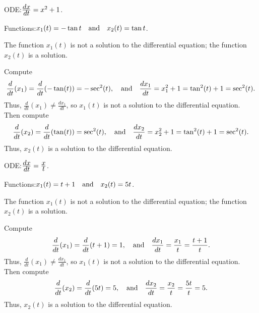 \documentclass{ximera}
\begin{document}
\begin{exercise}  \label{c3.1.bc}
ODE:\quad $\frac{\displaystyle dx}{\displaystyle dt} = x^2 + 1$.

Functions:\quad $x_1(t)=-\tan t \quad\mbox{and}\quad x_2(t)= \tan t$.

\begin{solution}

\ans The function $x_1(t)$ is not a solution to the differential equation;
the function $x_2(t)$ is a solution.

\soln Compute
\[
\frac{d}{dt}(x_1) = \frac{d}{dt}(-\tan(t)) = -\sec^2(t), \quad\mbox{and}\quad
\frac{dx_1}{dt} = x_1^2 + 1 = \tan^2(t) + 1 = \sec^2(t).
\]
Thus, $\frac{d}{dt}(x_1) \neq \frac{dx_1}{dt}$, so $x_1(t)$ is not a
solution to the differential equation.  Then compute
\[
\frac{d}{dt}(x_2) = \frac{d}{dt}(\tan(t)) = \sec^2(t), \quad\mbox{and}\quad
\frac{dx_2}{dt} = x_2^2 + 1 = \tan^2(t) + 1 = \sec^2(t).
\]
Thus, $x_2(t)$ is a solution to the differential equation. 

\end{solution}
\end{exercise}
\begin{exercise}  \label{c3.1.bd}
ODE:\quad $\frac{\displaystyle dx}{\displaystyle dt} = \frac{\displaystyle x}{\displaystyle t}$.

Functions:\quad $x_1(t)=t+1 \quad\mbox{and}\quad x_2(t)= 5t$.

\begin{solution}

\ans The function $x_1(t)$ is not a solution to the differential equation;
the function $x_2(t)$ is a solution.

\soln Compute
\[
\frac{d}{dt}(x_1) = \frac{d}{dt}(t + 1) = 1, \quad\mbox{and}\quad
\frac{dx_1}{dt} = \frac{x_1}{t} = \frac{t + 1}{t}.
\]
Thus, $\frac{d}{dt}(x_1) \neq \frac{dx_1}{dt}$, so $x_1(t)$ is not a
solution to the differential equation.  Then compute
\[
\frac{d}{dt}(x_2) = \frac{d}{dt}(5t) = 5, \quad\mbox{and}\quad
\frac{dx_2}{dt} = \frac{x_2}{t} = \frac{5t}{t} = 5.
\]
Thus, $x_2(t)$ is a solution to the differential equation.

\end{solution}
\end{exercise}
\end{document}
